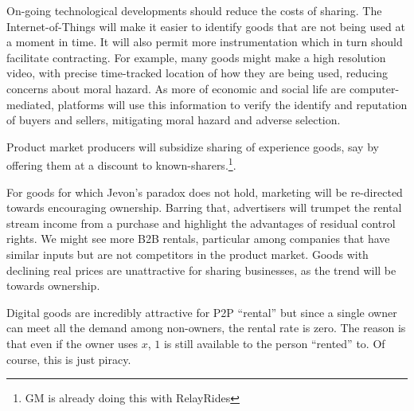 \documentclass[11pt]{article}
\begin{document}
On-going technological developments should reduce the costs of sharing. 
The Internet-of-Things will make it easier to identify goods that are not being used at a moment in time. 
It will also permit more instrumentation which in turn should facilitate contracting. 
For example, many goods might make a high resolution video, with precise time-tracked location of how they are being used, reducing concerns about moral hazard. 
As more of economic and social life are computer-mediated, platforms will use this information to verify the identify and reputation of buyers and sellers, mitigating moral hazard and adverse selection.  

Product market producers will subsidize sharing of experience goods, say by offering them at a discount to known-sharers.\footnote{GM is already doing this with RelayRides}.  

For goods for which Jevon's paradox does not hold, marketing will be re-directed towards encouraging ownership.
Barring that, advertisers will trumpet the rental stream income from a purchase and highlight the advantages of residual control rights. 
We might see more B2B rentals, particular among companies that have similar inputs but are not competitors in the product market. 
Goods with declining real prices are unattractive for sharing businesses, as the trend will be towards ownership. 

Digital goods are incredibly attractive for P2P ``rental'' but since a single owner can meet all the demand among non-owners, the rental rate is zero.
The reason is that even if the owner uses $x$, $1$ is still available to the person ``rented'' to.  
Of course, this is just piracy. 


\cite{sinai2005}
\cite{ikkala2014defining}
\cite{varian2000} 
\cite{byers2013rise} 
\cite{becker1965theory} 



\end{document}
